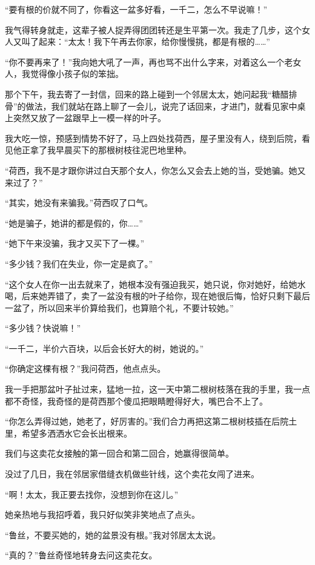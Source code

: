 \par “要有根的价就不同了，你看这一盆多好看，一千二，怎么不早说嘛！”
\par 我气得转身就走，这辈子被人捉弄得团团转还是生平第一次。我走了几步，这个女人又叫了起来：“太太！我下午再去你家，给你慢慢挑，都是有根的……”
\par “你不要再来了！”我向她大吼了一声，再也骂不出什么字来，对着这么一个老女人，我觉得像小孩子似的笨拙。
\par 那个下午，我去寄了一封信，回来的路上碰到一个邻居太太，她问起我“糖醋排骨”的做法，我们就站在路上聊了一会儿，说完了话回来，才进门，就看见家中桌上突然又放了一盆跟早上一模一样的叶子。
\par 我大吃一惊，预感到情势不好了，马上四处找荷西，屋子里没有人，绕到后院，看见他正拿了我早晨买下的那根树枝往泥巴地里种。
\par “荷西，我不是才跟你讲过白天那个女人，你怎么又会去上她的当，受她骗。她又来过了？”
\par “其实，她没有来骗我。”荷西叹了口气。
\par “她是骗子，她讲的都是假的，你……”
\par “她下午来没骗，我才又买下了一棵。”
\par “多少钱？我们在失业，你一定是疯了。”
\par “这个女人在你一出去就来了，她根本没有强迫我买，她只说，你对她好，给她水喝，后来她弄错了，卖了一盆没有根的叶子给你，现在她很后悔，恰好只剩下最后一盆了，所以回来半价算给我们，也算赔个礼，不要计较她。”
\par “多少钱？快说嘛！”
\par “一千二，半价六百块，以后会长好大的树，她说的。”
\par “你确定这棵有根？”我问荷西，他点点头。
\par 我一手把那盆叶子扯过来，猛地一拉，这一天中第二根树枝落在我的手里，我一点都不奇怪，我奇怪的是荷西那个傻瓜把眼睛瞪得好大，嘴巴合不上了。
\par “你怎么弄得过她，她老了，好厉害的。”我们合力再把这第二根树枝插在后院土里，希望多洒洒水它会长出根来。
\par 我们与这卖花女接触的第一回合和第二回合，她赢得很简单。
\par 没过了几日，我在邻居家借缝衣机做些针线，这个卖花女闯了进来。
\par “啊！太太，我正要去找你，没想到你在这儿。”
\par 她亲热地与我招呼着，我只好似笑非笑地点了点头。
\par “鲁丝，不要买她的，她的盆景没有根。”我对邻居太太说。
\par “真的？”鲁丝奇怪地转身去问这卖花女。
